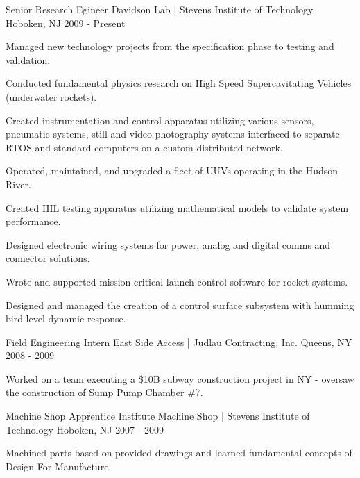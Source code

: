 \begin{cventries}
  \cventry
    {Senior Research Egineer} %
    {Davidson Lab | Stevens Institute of Technology} %
    {Hoboken, NJ} %
    {2009 - Present} %
    {
      \begin{cvitems} %
        \item {Managed new technology projects from the specification phase to
                testing and validation.} 
        \item {Conducted fundamental physics
                research on High Speed Supercavitating Vehicles (underwater
                rockets).}
        \item {Created instrumentation and control apparatus utilizing various
            sensors, pneumatic systems, still and video photography systems
            interfaced to separate RTOS and standard computers on a custom
            distributed network.} 
        \item {Operated, maintained, and upgraded a fleet of UUVs operating in
            the Hudson River.}
        \item {Created HIL testing apparatus utilizing mathematical models to
            validate system performance.} 
        \item {Designed electronic wiring systems for power, analog and digital
            comms and connector solutions.}
        \item {Wrote and supported mission critical launch control software for
            rocket systems.} 
        \item {Designed and managed the creation of a
            control surface subsystem with humming bird level dynamic response.}
      \end{cvitems}
    }

  \cventry
    {Field Engineering Intern} %
    {East Side Access | Judlau Contracting, Inc.} %
    {Queens, NY} %
    {2008 - 2009} %
    {%
      \begin{cvitems} %
        \item {Worked on a team executing a \$10B subway construction project in
            NY - oversaw the construction of Sump Pump Chamber \#7.}
      \end{cvitems}
    }

  \cventry
    {Machine Shop Apprentice} %
    {Institute Machine Shop | Stevens Institute of Technology} %
    {Hoboken, NJ} %
    {2007 - 2009} %
    {%
      \begin{cvitems} %
        \item {Machined parts based on provided drawings and learned fundamental
            concepts of Design For Manufacture}
      \end{cvitems}
    }

\end{cventries}
